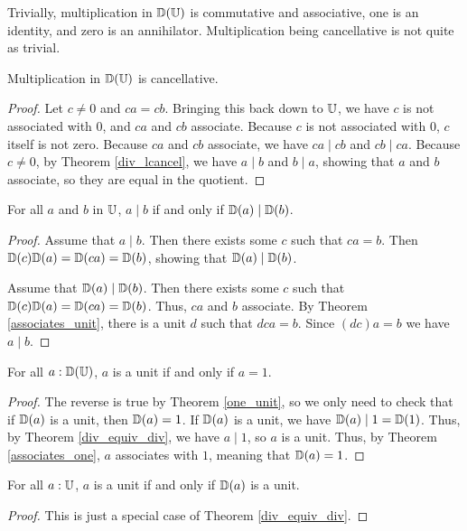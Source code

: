 \documentclass[../../math.tex]{subfiles}
\begin{document}
Trivially, multiplication in $\mathbb{D}(\mathbb{U})$ is commutative and associative, one is an
identity, and zero is an annihilator.  Multiplication being cancellative is not
quite as trivial.

\begin{instance}
    Multiplication in $\mathbb{D}(\mathbb{U})$ is cancellative.
\end{instance}
\begin{proof}
    Let $c \neq 0$ and $ca = cb$.  Bringing this back down to $\mathbb{U}$, we have $c$
    is not associated with $0$, and $ca$ and $cb$ associate.  Because $c$ is not
    associated with $0$, $c$ itself is not zero.  Because $ca$ and $cb$
    associate, we have $ca \mid cb$ and $cb \mid ca$.  Because $c \neq 0$, by
    Theorem \ref{div_lcancel}, we have $a \mid b$ and $b \mid a$, showing that
    $a$ and $b$ associate, so they are equal in the quotient.
\end{proof}

\begin{theorem} \label{div_equiv_div}
    For all $a$ and $b$ in $\mathbb{U}$, $a \mid b$ if and only if $\mathbb{D}(a) \mid \mathbb{D}(b)$.
\end{theorem}
\begin{proof}
    Assume that $a \mid b$.  Then there exists some $c$ such that $ca = b$.
    Then $\mathbb{D}(c) \mathbb{D}(a) = \mathbb{D}(ca) = \mathbb{D}(b)$, showing that $\mathbb{D}(a) \mid \mathbb{D}(b)$.

    Assume that $\mathbb{D}(a) \mid \mathbb{D}(b)$.  Then there exists some $c$ such that $\mathbb{D}(c)
    \mathbb{D}(a) = \mathbb{D}(ca) = \mathbb{D}(b)$.  Thus, $ca$ and $b$ associate.  By Theorem
    \ref{associates_unit}, there is a unit $d$ such that $dca = b$.  Since
    $(dc)a = b$ we have $a \mid b$.
\end{proof}

\begin{theorem} \label{div_equiv_unit}
    For all $a : \mathbb{D}(\mathbb{U})$, $a$ is a unit if and only if $a = 1$.
\end{theorem}
\begin{proof}
    The reverse is true by Theorem \ref{one_unit}, so we only need to check that
    if $\mathbb{D}(a)$ is a unit, then $\mathbb{D}(a) = 1$.  If $\mathbb{D}(a)$ is a unit, we have
    $\mathbb{D}(a) \mid 1 = \mathbb{D}(1)$.  Thus, by Theorem \ref{div_equiv_div}, we have $a
    \mid 1$, so $a$ is a unit.  Thus, by Theorem \ref{associates_one}, $a$
    associates with $1$, meaning that $\mathbb{D}(a) = 1$.
\end{proof}

\begin{theorem} \label{div_equiv_unit2}
    For all $a : \mathbb{U}$, $a$ is a unit if and only if $\mathbb{D}(a)$ is a unit.
\end{theorem}
\begin{proof}
    This is just a special case of Theorem \ref{div_equiv_div}.
\end{proof}
\end{document}
